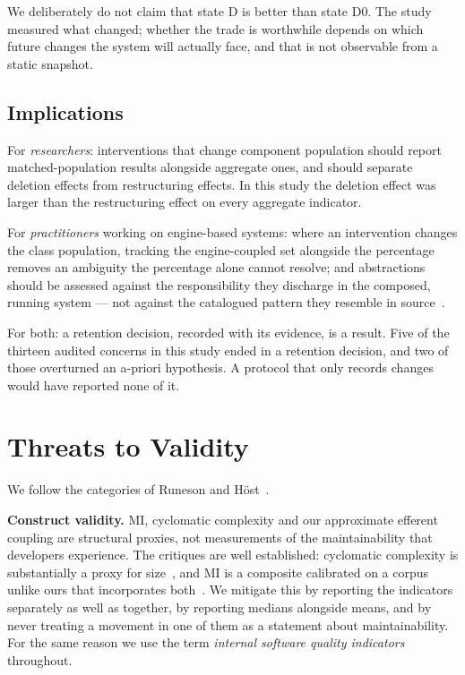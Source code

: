 \documentclass{sbc2019}%
\begin{document}
We deliberately do not claim that state D is better than state D0. The study
measured what changed; whether the trade is worthwhile depends on which future
changes the system will actually face, and that is not observable from a static
snapshot.

\subsection{Implications}

For \emph{researchers}: interventions that change component population should
report matched-population results alongside aggregate ones, and should separate
deletion effects from restructuring effects. In this study the deletion effect
was larger than the restructuring effect on every aggregate indicator.

For \emph{practitioners} working on engine-based systems: where an intervention
changes the class population, tracking the engine-coupled set alongside the
percentage removes an ambiguity the percentage alone cannot resolve; and
abstractions
should be assessed against the responsibility they discharge in the composed,
running system --- not against the catalogued pattern they resemble in source~\cite{gamma1995}.

For both: a retention decision, recorded with its evidence, is a result. Five of the thirteen audited
concerns in this study ended in a retention decision, and two of those
overturned an a-priori hypothesis. A protocol that only records changes would have reported
none of it.


\FloatBarrier

\section{Threats to Validity}\label{sec:threats}

We follow the categories of Runeson and H\"ost~\cite{runeson2009}.

\medskip\noindent\textbf{Construct validity.} MI, cyclomatic complexity and our
approximate efferent coupling are structural proxies, not measurements of the
maintainability that developers experience. The critiques are well established: cyclomatic
complexity is substantially a proxy for size~\cite{shepperd1988}, and MI is a
composite calibrated on a corpus unlike ours that incorporates both~\cite{coleman1994,ardito2020}. We mitigate this by reporting the indicators
separately as well as together, by reporting medians alongside means, and by
never treating a movement in one of them as a statement about maintainability.
For the same reason we use the term \emph{internal software quality indicators}
throughout.
\end{document}
